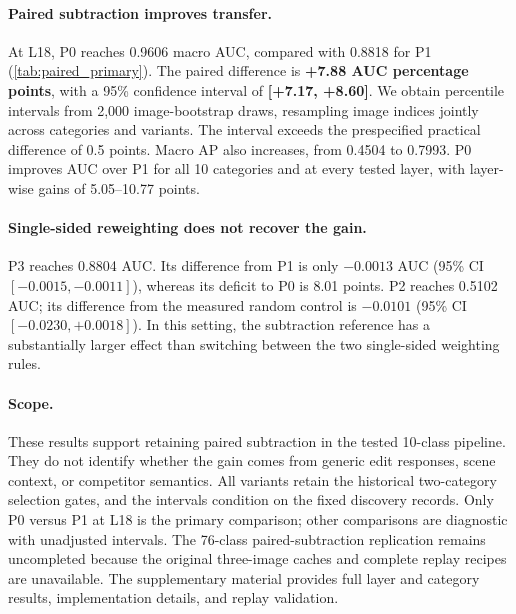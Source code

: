 

\paragraph{Paired subtraction improves transfer.}
At L18, P0 reaches 0.9606 macro AUC, compared with 0.8818 for P1
(\cref{tab:paired_primary}). The paired difference is
\textbf{+7.88 AUC percentage points}, with a 95\% confidence interval
of \textbf{[+7.17, +8.60]}. We obtain percentile intervals from 2,000
image-bootstrap draws, resampling image indices jointly across categories
and variants. The interval exceeds the prespecified practical difference
of 0.5 points. Macro AP also increases, from 0.4504 to 0.7993.
P0 improves AUC over P1 for all 10 categories and at every tested layer,
with layer-wise gains of 5.05--10.77 points.

\paragraph{Single-sided reweighting does not recover the gain.}
P3 reaches 0.8804 AUC. Its difference from P1 is only \(-0.0013\) AUC
(95\% CI \([-0.0015,-0.0011]\)), whereas its deficit to P0 is 8.01
points. P2 reaches 0.5102 AUC; its difference from the measured random
control is \(-0.0101\) (95\% CI \([-0.0230,+0.0018]\)). In this
setting, the subtraction reference has a substantially larger effect than
switching between the two single-sided weighting rules.

\paragraph{Scope.}
These results support retaining paired subtraction in the tested 10-class
pipeline. They do not identify whether the gain comes from generic edit
responses, scene context, or competitor semantics. All variants retain
the historical two-category selection gates, and the intervals condition
on the fixed discovery records. Only P0 versus P1 at L18 is the primary
comparison; other comparisons are diagnostic with unadjusted intervals.
The 76-class paired-subtraction replication remains uncompleted because
the original three-image caches and complete replay recipes are unavailable.
The supplementary material provides full layer and category results,
implementation details, and replay validation.
